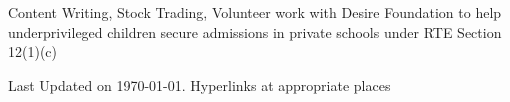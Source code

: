 \documentclass[11pt,a4paper,calibri]{moderncv}        %
\begin{document}
	Content Writing, Stock Trading, Volunteer work with Desire Foundation to help underprivileged children secure admissions in private schools under RTE Section 12(1)(c)
	
	
	\vfill
	\textnormal{\footnotesize Last Updated on \today. Hyperlinks at appropriate places}
	
%	
	
	
	
\end{document}
